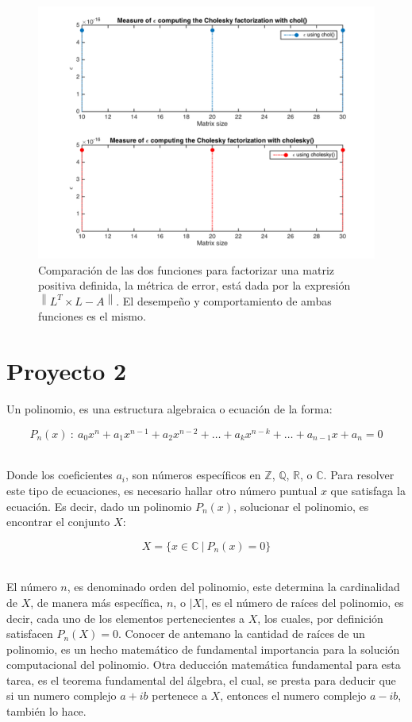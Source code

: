 \documentclass[11pt, spanish]{article}
\newcommand{\norm}[1]{\left\lVert#1\right\rVert}
\begin{document}
\begin{itemize}
\begin{figure}[h]
    \centering
    \includegraphics[width=14cm]{data/img/cholcomparisson}
    \caption{Comparación de las dos funciones para factorizar una matriz positiva definida, la métrica de error, está dada por la expresión $\norm{L^T \times L - A}$. El desempeño y comportamiento de ambas funciones es el mismo.}
    \label{fig:cholcomparisson}
\end{figure}

\end{itemize}


\newpage
\section{Proyecto 2}

Un polinomio, es una estructura algebraica o ecuación de la forma:

$$P_{n}(x)\ :\ a_{0}x^{n} + a_{1}x^{n-1} + a_{2}x^{n-2} + \dots + a_{k}x^{n-k} + \dots + a_{n-1}x  + a_{n} = 0 $$\

Donde los coeficientes $a_i$, son números específicos en $\mathbb{Z}$, $\mathbb{Q}$, $\mathbb{R}$, o $\mathbb{C}$. Para resolver este tipo de ecuaciones, es necesario hallar otro número puntual $x$ que satisfaga la ecuación. Es decir, dado un polinomio $P_{n}(x)$, solucionar el polinomio, es encontrar el conjunto $X$:

$$X = \{ x \in \mathbb{C}\ |\ P_{n}(x) = 0\}$$\

El número $n$, es denominado orden del polinomio, este determina la cardinalidad de $X$, de manera más específica, $n$, o $|X|$, es el número de raíces del polinomio, es decir, cada uno de los elementos pertenecientes a $X$, los cuales, por definición satisfacen $P_n(X) = 0$. Conocer de antemano la cantidad de raíces de un polinomio, es un hecho matemático de fundamental importancia para la solución computacional del polinomio. Otra deducción matemática fundamental para esta tarea, es el teorema fundamental del álgebra, el cual, se presta para deducir que si un numero complejo $a + ib$ pertenece a $X$, entonces el numero complejo $a - ib$, también lo hace.\\
\end{document}
